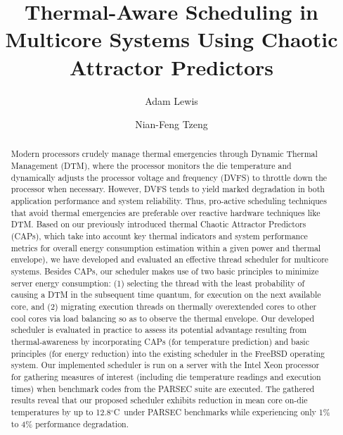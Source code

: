 \documentclass[times, 10pt,twocolumn]{IEEEtran}
\begin{document}
\title{Thermal-Aware Scheduling in  Multicore Systems Using Chaotic
  Attractor Predictors} 
\author{Adam  Lewis} 
\author{Nian-Feng Tzeng} 
\date{}
\maketitle  
\newtheorem{defn}{Definition}
\newtheorem{thm}{Theorem}
\thispagestyle{empty}
\begin{abstract}
  Modern processors crudely manage thermal emergencies through Dynamic
  Thermal Management (DTM), where the processor monitors the die
  temperature and dynamically adjusts the processor voltage and
  frequency (DVFS) to throttle down the processor when
  necessary. However, DVFS tends to yield marked degradation in both
  application performance and system reliability. Thus, pro-active
  scheduling techniques that avoid thermal emergencies are preferable
  over reactive hardware techniques like DTM.  Based on our previously
  introduced thermal Chaotic Attractor Predictors (CAPs), which take into
  account key thermal indicators and system performance metrics for
  overall energy consumption estimation within a given power and thermal
  envelope), we have developed and evaluated an effective thread
  scheduler for multicore systems.  Besides CAPs, our scheduler makes
  use of two basic principles to minimize server energy consumption: (1)
  selecting the thread with the least probability of causing a DTM in
  the subsequent time quantum, for execution on the next available core,
  and (2) migrating execution threads on thermally overextended cores to
  other cool cores via load balancing so as to observe the thermal
  envelope.  Our developed scheduler is evaluated in practice to assess
  its potential advantage resulting from thermal-awareness by
  incorporating CAPs (for temperature prediction) and basic principles
  (for energy reduction) into the existing scheduler in the FreeBSD
  operating system.  Our implemented scheduler is run on a server with
  the Intel Xeon processor for gathering measures of interest (including
  die temperature readings and execution times) when benchmark codes
  from the PARSEC suite are executed.  The gathered
  results reveal that our proposed scheduler exhibits reduction in mean
  core on-die temperatures by up to 12.8$^{\circ}$C\ under PARSEC
  benchmarks while experiencing
  only 1\% to 4\% performance degradation.
\end{abstract}
\end{document}
